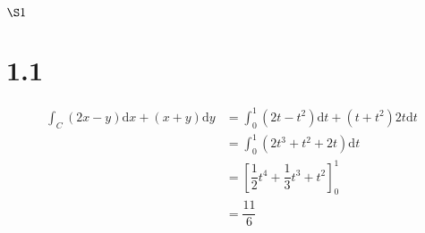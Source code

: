 \documentclass[11pt]{article}
\newcommand{\ds}{\displaystyle}
\begin{document}
	\CJKfont
	\begin{center}
		$\S 1$
	\end{center}
	\section*{1.1}
	\begin{align*}
		\ds\int_{C}\left(2x-y\right)\mathrm{d}x+\left(x+y\right)\mathrm{d}y
		&=\ds\int_{0}^{1}\left(2t-t^{2}\right)\mathrm{d}t+\left(t+t^{2}\right)2t\mathrm{d}t\\
		&=\ds\int_{0}^{1}\left(2t^{3}+t^{2}+2t\right)\mathrm{d}t\\
		&=\left[\dfrac{1}{2}t^{4}+\dfrac{1}{3}t^{3}+t^{2}\right]_{0}^{1}\\
		&=\dfrac{11}{6}
	\end{align*}
	
\end{document}

